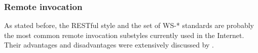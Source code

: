 \subsubsection{Remote invocation}
\label{sec:remote_invocation}


% 
% 


% 


As stated before, the RESTful style and the set of WS-* standards are probably the most common remote invocation substyles currently used in the Internet.
Their advantages and disadvantages were extensively discussed by \citet{pautasso_restful_2008}.

